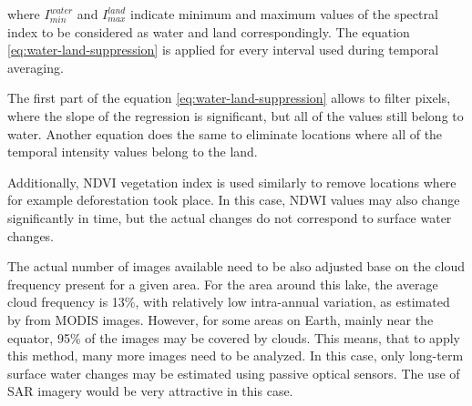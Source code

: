 where $I_{min}^{water}$ and $I_{max}^{land}$ indicate minimum and maximum values of the spectral index to be considered as water and land correspondingly. The equation \ref{eq:water-land-suppression} is applied for every interval used during temporal averaging.

The first part of the equation \ref{eq:water-land-suppression} allows to filter pixels, where the slope of the regression is significant, but all of the values still belong to water. Another equation does the same to eliminate locations where all of the temporal intensity values belong to the land.

Additionally, NDVI vegetation index is used similarly to remove locations where for example deforestation took place. In this case, NDWI values may also change significantly in time, but the actual changes do not correspond to surface water changes.


The actual number of images available need to be also adjusted base on the cloud frequency present for a given area. For the area around this lake, the average cloud frequency is 13\%, with relatively low intra-annual variation, as estimated by \citep{wilson2016remotely} from MODIS images. However, for some areas on Earth, mainly near the equator, 95\% of the images may be covered by clouds. This means, that to apply this method, many more images need to be analyzed. In this case, only long-term surface water changes may be estimated using passive optical sensors. The use of SAR imagery would be very attractive in this case.

